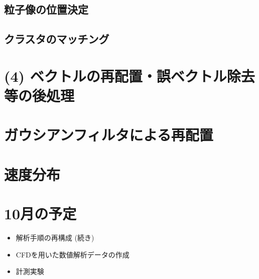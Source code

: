 \documentclass[twocolumn,a4j]{jsarticle}
\begin{document}
\subsection{粒子像の位置決定}
\subsection{クラスタのマッチング}

\section{(4) ベクトルの再配置・誤ベクトル除去等の後処理}
\section{ガウシアンフィルタによる再配置}
\section{速度分布}

\section{10月の予定}
\begin{itemize}
	\item 解析手順の再構成 (続き)
	\item CFDを用いた数値解析データの作成
	\item 計測実験
\end{itemize}
\end{document}

